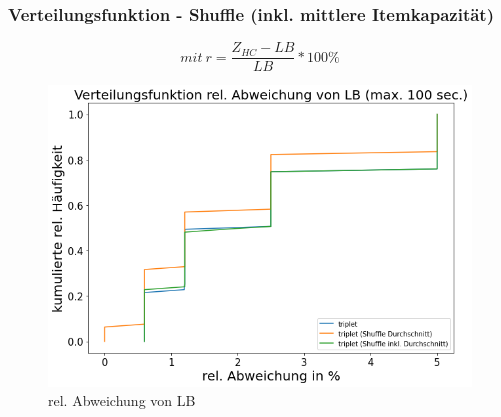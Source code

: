 \documentclass{beamer}
\begin{document}
\begin{frame}

\frametitle{Verteilungsfunktion - Shuffle (inkl. mittlere Itemkapazität)}

\begin{footnotesize}
\begin{equation}
mit \ r = \frac{Z_{HC}-LB}{LB} * 100\%
\end{equation}
\end{footnotesize}

\begin{figure}[!htbp]
\begin{center}
\includegraphics[scale=0.3]{img/dist9.png}
\end{center}
\caption{rel. Abweichung von LB}
\label{fig:architecture}
\end{figure}



\end{frame}
\end{document}

